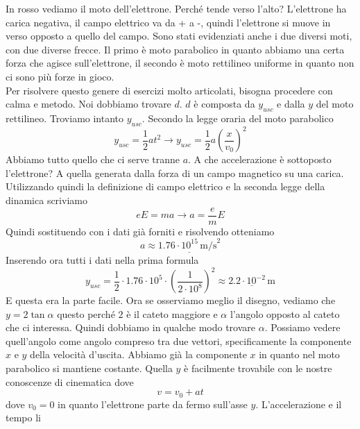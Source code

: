 In rosso vediamo il moto dell'elettrone. Perché tende verso l'alto? L'elettrone ha carica
negativa, il campo elettrico va da + a -, quindi l'elettrone si muove in verso opposto a
quello del campo. Sono stati evidenziati anche i due diversi moti, con due diverse frecce.
Il primo è moto parabolico in quanto abbiamo una certa forza che agisce sull'elettrone, il secondo
è moto rettilineo uniforme in quanto non ci sono più forze in gioco.\\ [\baselineskip]
Per risolvere questo genere di esercizi molto articolati, bisogna procedere con calma e metodo.
Noi dobbiamo trovare $d$. $d$ è composta da $y_{usc}$ e dalla $y$ del moto rettilineo. Troviamo
intanto $y_{usc}$. Secondo la legge oraria del moto parabolico
\begin{equation*}
  y_{usc} = \frac{1}{2}at^2 \rightarrow y_{usc} = \frac{1}{2}a \left( \frac{x}{v_0} \right)^2
\end{equation*}
Abbiamo tutto quello che ci serve tranne $a$. A che accelerazione è sottoposto l'elettrone?
A quella generata dalla forza di un campo magnetico su una carica. Utilizzando quindi la 
definizione di campo elettrico e la seconda legge della dinamica scriviamo
\begin{equation*}
  eE = ma \rightarrow a = \frac{e}{m}E
\end{equation*}
Quindi sostituendo con i dati già forniti e risolvendo otteniamo
\begin{equation*}
  a \approx \underline{1.76\cdot10^{15}\,\text{m/s}^2} 
\end{equation*}
Inserendo ora tutti i dati nella prima formula
\begin{equation*}
  y_{usc} = \frac{1}{2}\cdot1.76\cdot10^5\cdot \left( \frac{1}{2\cdot10^8} \right)^2
  \approx \underline{2.2\cdot10^{-2}\,\text{m}} 
\end{equation*}
E questa era la parte facile. Ora se osserviamo meglio il disegno, vediamo che $y=2\tan\alpha$
questo perché $2$ è il cateto maggiore e $\alpha$ l'angolo opposto al cateto che ci interessa.
Quindi dobbiamo in qualche modo trovare $\alpha$. Possiamo vedere quell'angolo come angolo 
compreso tra due vettori, specificamente la componente $x$ e $y$ della velocità d'uscita.
Abbiamo già la componente $x$ in quanto nel moto parabolico si mantiene costante. Quella
$y$ è facilmente trovabile con le nostre conoscenze di cinematica dove
\begin{equation*}
  v=v_0+at
\end{equation*}
dove $v_0=0$ in quanto l'elettrone parte da fermo sull'asse $y$. L'accelerazione e il tempo li

